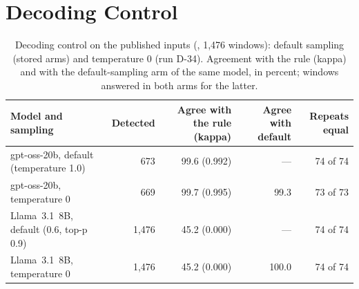 \section{Decoding Control}
\label{sup:decoding}

\begin{table}[H]
\centering
\caption{Decoding control on the published inputs (, 1{,}476 windows): default sampling (stored arms) and temperature 0 (run D-34). Agreement with the rule (kappa) and with the default-sampling arm of the same model, in percent; windows answered in both arms for the latter.}
\label{tab:s:decoding}
\footnotesize
\setlength{\tabcolsep}{3pt}
\begin{tabularx}{\textwidth}{@{}Xrrrr@{}}
\toprule
Model and sampling & Detected & Agree with the rule (kappa) & Agree with default & Repeats equal \\
\midrule
gpt-oss-20b, default (temperature 1.0) & 673 & 99.6 (0.992) & --- & 74 of 74 \\
gpt-oss-20b, temperature 0 & 669 & 99.7 (0.995) & 99.3 & 73 of 73 \\
Llama~3.1~8B, default (0.6, top-p 0.9) & 1{,}476 & 45.2 (0.000) & --- & 74 of 74 \\
Llama~3.1~8B, temperature 0 & 1{,}476 & 45.2 (0.000) & 100.0 & 74 of 74 \\
\bottomrule
\end{tabularx}
\end{table}
